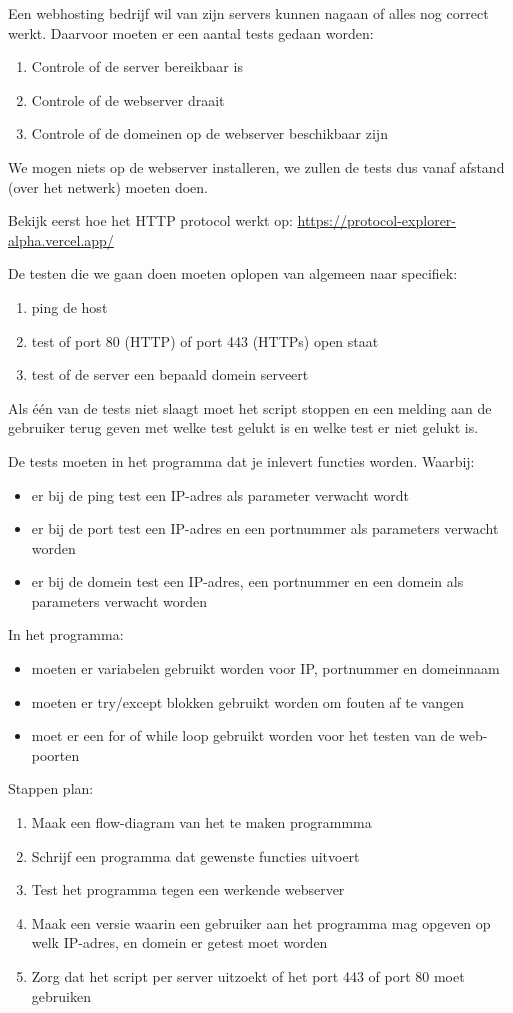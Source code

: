 Een webhosting bedrijf wil van zijn servers kunnen nagaan of alles nog correct werkt. Daarvoor moeten er een aantal tests gedaan worden:
\begin{enumerate}
	\item Controle of de server bereikbaar is
	\item Controle of de webserver draait
	\item Controle of de domeinen op de webserver beschikbaar zijn
\end{enumerate}
We mogen niets op de webserver installeren, we zullen de tests dus vanaf afstand (over het netwerk) moeten doen.

Bekijk eerst hoe het HTTP protocol werkt op: \url{https://protocol-explorer-alpha.vercel.app/}

De testen die we gaan doen moeten oplopen van algemeen naar specifiek:
\begin{enumerate}
\item ping de host
\item test of port 80 (HTTP) of port 443 (HTTPs) open staat
\item test of de server een bepaald domein serveert
\end{enumerate}
Als \'e\'en van de tests niet slaagt moet het script stoppen en een melding aan de gebruiker terug geven met welke test gelukt is en welke test er niet gelukt is.

De tests moeten in het programma dat je inlevert functies worden. Waarbij:
\begin{itemize}
	\item er bij de ping test een IP-adres als parameter verwacht wordt
	\item er bij de port test een IP-adres en een portnummer als parameters verwacht worden
	\item er bij de domein test een IP-adres, een portnummer en een domein als parameters verwacht worden
\end{itemize}

In het programma:
\begin{itemize}
	\item moeten er variabelen gebruikt worden voor IP, portnummer en domeinnaam
	\item moeten er try/except blokken gebruikt worden om fouten af te vangen
	\item moet er een for of while loop gebruikt worden voor het testen van de web-poorten
\end{itemize}

Stappen plan:
\begin{enumerate}
	\item Maak een flow-diagram van het te maken programmma
	\item Schrijf een programma dat gewenste functies uitvoert
	\item Test het programma tegen een werkende webserver
	\item Maak een versie waarin een gebruiker aan het programma mag opgeven op welk IP-adres, en domein er getest moet worden
	\item Zorg dat het script per server uitzoekt of het port 443 of port 80 moet gebruiken
\end{enumerate}

